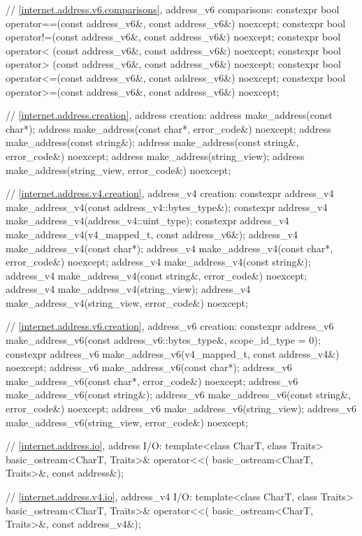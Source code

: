 \begin{codeblock}
{{{{  // \ref{internet.address.v6.comparisons}, address_v6 comparisons:
  constexpr bool operator==(const address_v6&, const address_v6&) noexcept;
  constexpr bool operator!=(const address_v6&, const address_v6&) noexcept;
  constexpr bool operator< (const address_v6&, const address_v6&) noexcept;
  constexpr bool operator> (const address_v6&, const address_v6&) noexcept;
  constexpr bool operator<=(const address_v6&, const address_v6&) noexcept;
  constexpr bool operator>=(const address_v6&, const address_v6&) noexcept;

  // \ref{internet.address.creation}, address creation:
  address make_address(const char*);
  address make_address(const char*, error_code&) noexcept;
  address make_address(const string&);
  address make_address(const string&, error_code&) noexcept;
  address make_address(string_view);
  address make_address(string_view, error_code&) noexcept;

  // \ref{internet.address.v4.creation}, address_v4 creation:
  constexpr address_v4 make_address_v4(const address_v4::bytes_type&);
  constexpr address_v4 make_address_v4(address_v4::uint_type);
  constexpr address_v4 make_address_v4(v4_mapped_t, const address_v6&);
  address_v4 make_address_v4(const char*);
  address_v4 make_address_v4(const char*, error_code&) noexcept;
  address_v4 make_address_v4(const string&);
  address_v4 make_address_v4(const string&, error_code&) noexcept;
  address_v4 make_address_v4(string_view);
  address_v4 make_address_v4(string_view, error_code&) noexcept;

  // \ref{internet.address.v6.creation}, address_v6 creation:
  constexpr address_v6 make_address_v6(const address_v6::bytes_type&,
                                       scope_id_type = 0);
  constexpr address_v6 make_address_v6(v4_mapped_t, const address_v4&) noexcept;
  address_v6 make_address_v6(const char*);
  address_v6 make_address_v6(const char*, error_code&) noexcept;
  address_v6 make_address_v6(const string&);
  address_v6 make_address_v6(const string&, error_code&) noexcept;
  address_v6 make_address_v6(string_view);
  address_v6 make_address_v6(string_view, error_code&) noexcept;

  // \ref{internet.address.io}, address I/O:
  template<class CharT, class Traits>
    basic_ostream<CharT, Traits>& operator<<(
      basic_ostream<CharT, Traits>&, const address&);

  // \ref{internet.address.v4.io}, address_v4 I/O:
  template<class CharT, class Traits>
    basic_ostream<CharT, Traits>& operator<<(
      basic_ostream<CharT, Traits>&, const address_v4&);

}}}}
\end{codeblock}
